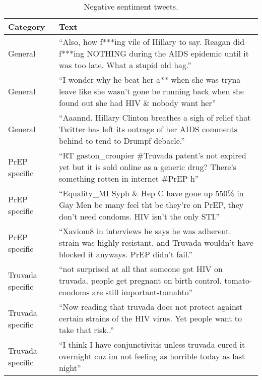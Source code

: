 \begin{table*}
\centering
\caption{Negative sentiment tweets.}
\begin{tabular}{|p{2.5cm}|p{10cm}|} \hline
Category & Text\\ \hline
General & ``Also, how f***ing vile of Hillary to say. Reagan did f***ing NOTHING during the AIDS epidemic until it was too late. What a stupid old hag.''\\ \hline
General & ``I wonder why he beat her a** when she was tryna leave like she wasn't gone be running back when she found out she had HIV \& nobody want her''\\ \hline
General & ``Aaannd. Hillary Clinton breathes a sigh of relief that Twitter has left its outrage of her AIDS comments behind to tend to Drumpf debacle.''\\ \hline

PrEP specific & ``RT gaston\_croupier \#Truvada patent's not expired yet but it is sold online as a generic drug? There's something rotten in internet \#PrEP h''\\ \hline
PrEP specific & ``Equality\_MI Syph \& Hep C have gone up 550\% in Gay Men bc many feel tht bc they're on PrEP, they don't need condoms. HIV isn't the only STI.''\\ \hline
PrEP specific & ``Xaviom8 in interviews he says he was adherent. strain was highly resistant, and Truvada wouldn't have blocked it anyways. PrEP didn't fail.''\\ \hline

Truvada specific & ``not surprised at all that someone got HIV on truvada. people get pregnant on birth control. tomato-condoms are still important-tomahto''\\ \hline
Truvada specific & ``Now reading that truvada does not protect against certain strains of the HIV virus. Yet people want to take that risk..''\\ \hline
Truvada specific & ``I think I have conjunctivitis unless truvada cured it overnight cuz im not feeling as horrible today as last night''\\ \hline

\hline\end{tabular}
\label{tbl:neg}
\end{table*}

